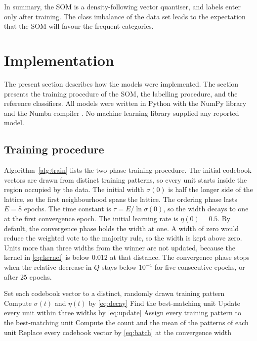 \documentclass[conference,10pt]{IEEEtran}
\begin{document}
In summary, the SOM is a density-following vector quantiser, and labels enter only after training.
The class imbalance of the data set leads to the expectation that the SOM will favour the frequent categories.

\section{Implementation}
\label{sec:implementation}
The present section describes how the models were implemented.
The section presents the training procedure of the SOM, the labelling procedure, and the reference classifiers.
All models were written in Python with the NumPy library \cite{harris2020} and the Numba compiler \cite{lam2015}.
No machine learning library supplied any reported model.

\subsection{Training procedure}
Algorithm~\ref{alg:train} lists the two-phase training procedure.
The initial codebook vectors are drawn from distinct training patterns, so every unit starts inside the region occupied by the data.
The initial width $\sigma(0)$ is half the longer side of the lattice, so the first neighbourhood spans the lattice.
The ordering phase lasts $E=8$ epochs.
The time constant is $\tau=E/\ln\sigma(0)$, so the width decays to one at the first convergence epoch.
The initial learning rate is $\eta(0)=0.5$.
By default, the convergence phase holds the width at one.
A width of zero would reduce the weighted vote to the majority rule, so the width is kept above zero.
Units more than three widths from the winner are not updated, because the kernel in \eqref{eq:kernel} is below 0.012 at that distance.
The convergence phase stops when the relative decrease in $Q$ stays below $10^{-4}$ for five consecutive epochs, or after 25 epochs.

\begin{algorithm}[tb]
\caption{Two-phase training of the map}
\label{alg:train}
\begin{algorithmic}[1]
\State Set each codebook vector to a distinct, randomly drawn training pattern
  \State Compute $\sigma(t)$ and $\eta(t)$ by \eqref{eq:decay}
    \State Find the best-matching unit
    \State Update every unit within three widths by \eqref{eq:update}
  \EndFor
\EndFor
\Repeat
  \State Assign every training pattern to the best-matching unit
  \State Compute the count and the mean of the patterns of each unit
  \State Replace every codebook vector by \eqref{eq:batch} at the convergence width
\end{algorithmic}
\end{algorithm}
\end{document}
